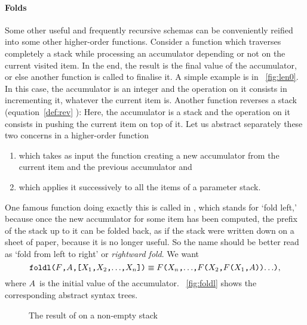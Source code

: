 \paragraph{Folds}
\label{par:folds}

Some other useful and frequently recursive schemas can be conveniently
reified into some other higher\hyp{}order functions. Consider a
function which traverses completely a stack while processing an
accumulator depending or not on the current visited item. In the end,
the result is the final value of the accumulator, or else another
function is called to finalise it. A simple example is  in
\fig~\vref{fig:len0}. In this case, the accumulator is an integer and
the operation on it consists in incrementing it, whatever the current
item is. Another function reverses a stack (equation~\eqref{def:rev}
):  Here, the accumulator is
a stack and the operation on it consists in pushing the current item
on top of it. Let us abstract separately these two concerns in a
higher\hyp{}order function
\begin{enumerate}

  \item which takes as input the function creating a new accumulator
    from the current item and the previous accumulator and

  \item which applies it successively to all the items of a parameter
    stack.

\end{enumerate}
One famous function doing exactly this is called  in
\Erlang, which stands for `fold left,' because once the new
accumulator for some item has been computed, the prefix of the stack
up to it can be folded back, as if the stack were written down on a
sheet of paper, because it is no longer useful. So the name should be
better read as `fold from left to right' or \emph{rightward fold}. We
want
\begin{equation*}
\texttt{foldl(\(F\),\(A\),[\(X_1\),\(X_2\),\(\ldots\),\(X_{n}\)])}
\equiv
\texttt{\(F\)(\(X_{n}\),\(\ldots\),\(F\)(\(X_2\),\(F\)(\(X_1\),\(A\)))\(\ldots\))},
\end{equation*}
where \(A\)~is the initial value of the
accumulator. \Fig~\vref{fig:foldl} shows the corresponding abstract
syntax trees.
\begin{figure}[b]
\centering
{}
\qquad
{}
\caption{The result of  on a non\hyp{}empty stack}
\label{fig:foldl}
\end{figure}
